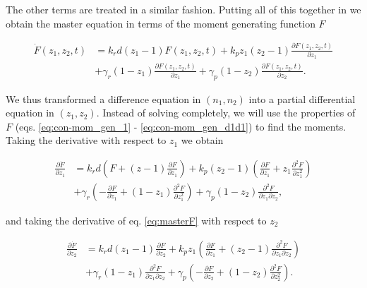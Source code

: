 The other terms are treated in a similar fashion. Putting all of this together in we obtain the master equation in terms of the moment generating function $F$

\begin{equation}
  \label{eq:masterF}
  \begin{split}
    \dot{F}(z_1,z_2,t) &= k_rd(z_1-1)F(z_1,z_2,t) + k_pz_1(z_2-1)\frac{\partial F(z_1,z_2,t)}{\partial z_1} \\
    &+ \gamma_r(1-z_1)\frac{\partial F(z_1,z_2,t)}{\partial z_1} + \gamma_p(1-z_2)\frac{\partial F(z_1,z_2,t)}{\partial z_2}.
  \end{split}
\end{equation}

We thus transformed a difference equation in $(n_1,n_2)$ into a partial differential equation in $(z_1,z_2)$. Instead of solving completely, we will use the properties of $F$ (eqs. \eqref{eq:con-mom_gen_1} - \eqref{eq:con-mom_gen_d1d1}) to find the moments. Taking the derivative with respect to $z_1$ we obtain

\begin{equation}
  \label{eq:dz1}
  \begin{split}
    \frac{\partial \dot{F}}{\partial z_1} &= k_rd\left( F+(z-1)\frac{\partial F}{\partial z_1} \right) + k_p(z_2-1) \left( \frac{\partial F}{\partial z_1} + z_1 \frac{\partial^2 F}{\partial z_1^2} \right)\\
    &+\gamma_r\left(-\frac{\partial F}{\partial z_1}+(1-z_1)\frac{\partial^2 F}{\partial z_1^2}\right)+\gamma_p(1-z_2)\frac{\partial^2 F}{\partial z_1 \partial z_2},
  \end{split}
\end{equation}

and taking the derivative of eq. \eqref{eq:masterF} with respect to $z_2$

\begin{equation}
  \label{eq:dz2}
  \begin{split}
    \frac{\partial \dot{F}}{\partial z_2}&=k_rd(z_1-1)\frac{\partial F}{\partial z_2} + k_pz_1\left(\frac{\partial F}{\partial z_1} + (z_2-1)\frac{\partial^2 F}{\partial z_1 \partial z_2} \right)\\
    &+ \gamma_r(1-z_1)\frac{\partial^2 F}{\partial z_1 \partial z_2} + \gamma_p\left(-\frac{\partial F}{\partial z_2}+(1-z_2)\frac{\partial^2 F}{\partial z_2^2}\right).
  \end{split}
\end{equation}


